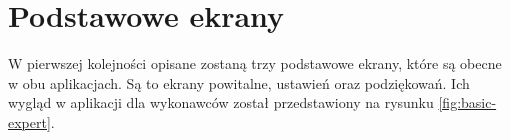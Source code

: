 \section{Podstawowe ekrany}

W pierwszej kolejności opisane zostaną trzy podstawowe ekrany, które są obecne w obu aplikacjach. Są to ekrany powitalne, ustawień oraz podziękowań. Ich wygląd w aplikacji dla wykonawców został przedstawiony na rysunku \ref{fig:basic-expert}.


